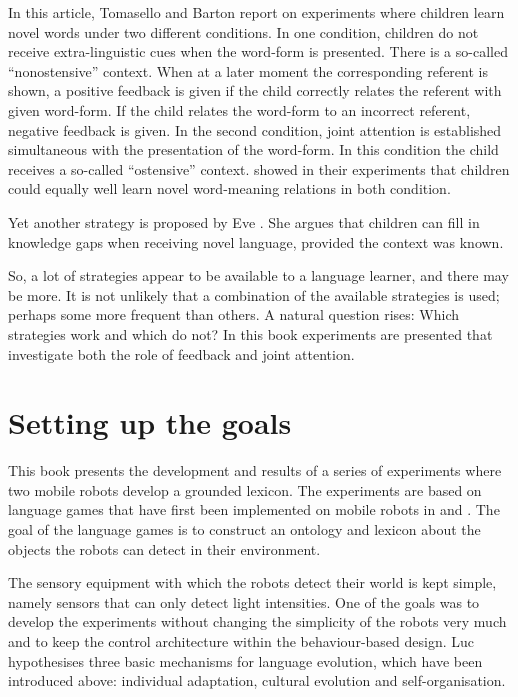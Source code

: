 In this article, Tomasello and Barton report on experiments where children learn novel words under two different conditions. In one condition, children do not receive extra-linguistic cues when the word-form is presented. There is a so-called ``nonostensive'' context. When at a later moment the corresponding referent is shown, a positive feedback is given if the child correctly relates the referent with given word-form. If the child relates the word-form to an incorrect referent, negative feedback is given. In the second condition, joint attention is established simultaneous with the presentation of the word-form. In this condition the child receives a so-called ``ostensive'' context. \citet{tomasellobarton:1994} showed in their experiments that children could equally well learn novel word-meaning relations in both condition.

Yet another strategy is proposed by Eve \citet{clark:1993}. She argues that children can fill in knowledge gaps when receiving novel language, provided the context was known. 


So, a lot of strategies appear to be available to a language learner, and there may be more. It is not unlikely that a combination of the available strategies is used; perhaps some more frequent than others. A natural question rises: Which strategies work and which do not? In this book experiments are presented that investigate both the role of feedback and joint attention.


\section{Setting up the goals}\label{s:intro:goals}

This book presents the development and results of a series of experiments where two mobile robots develop a grounded lexicon. The experiments are based on language games that have first been implemented on mobile robots in \citet{steelsvogt:1997} and \citet{vogt:1997}. The goal of the language games is to construct an ontology and lexicon about the objects the robots can detect in their environment.



The sensory equipment with which the robots detect their world is kept simple, namely sensors that can only detect light intensities. One of the goals was to develop the experiments without changing the simplicity of the robots very much and to keep the control architecture within the behaviour-based design. Luc \citet{steels:1996a} hypothesises three basic mechanisms for language evolution, which have been introduced above: individual adaptation, cultural evolution and self-organisation. 

